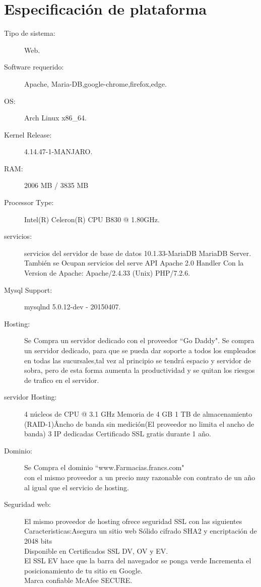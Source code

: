 \section{Especificación de plataforma}	

\begin{description}

	\item[Tipo de sistema:] Web.
	\item[Software requerido:]Apache, Maria-DB,google-chrome,firefox,edge.
	\item[OS:] Arch Linux x86\_64.
	\item[Kernel Release:] 4.14.47-1-MANJARO.
	\item[RAM:] 2006 MB / 3835 MB
	\item[Processor Type:] Intel(R) Celeron(R) CPU B830 @ 1.80GHz.
	\item[servicios:] servicios del servidor de base de datos 10.1.33-MariaDB MariaDB Server.\\También se Ocupan servicios del serve API Apache 2.0 Handler
Con la Version de Apache:	Apache/2.4.33 (Unix) PHP/7.2.6.
	\item[Mysql Support:] mysqlnd 5.0.12-dev - 20150407.
	\item[Hosting:]Se Compra un servidor dedicado con el proveedor ``Go Daddy".
	Se compra un servidor dedicado, para que se pueda dar soporte a  todos los empleados en todas las sucursales,tal vez al principio se tendrá espacio y servidor de sobra, pero de esta forma aumenta la productividad y se quitan los riesgos de trafico en el servidor.
	\item[servidor Hosting:]4 núcleos de CPU @ 3.1 GHz
Memoria de 4 GB
1 TB de almacenamiento (RAID-1)\^
Ancho de banda sin medición(El proveedor no limita el ancho de banda) 
3 IP dedicadas
Certificado SSL gratis durante 1 año.
	\item[Dominio:] Se Compra el dominio ``www.Farmacias.francs.com"\\  con el mismo proveedor a un precio muy razonable con contrato de un año al igual que el servicio de hosting.
	\item[Seguridad web:]El mismo proveedor de hosting ofrece seguridad SSL
	con las siguientes Caracteristicas:Asegura un sitio web
Sólido cifrado SHA2 y encriptación de 2048 bits\\
Disponible en Certificados SSL DV, OV y EV.\\
El SSL EV hace que la barra del navegador se ponga verde 
Incrementa el posicionamiento de tu sitio en Google.\\
Marca confiable McAfee SECURE.\\
\end{description}
